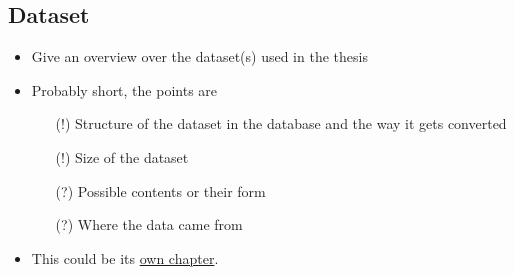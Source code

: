 \subsection{Dataset}
\begin{itemize}
  \item Give an overview over the dataset(s) used in the thesis
  \item Probably short, the points are
        \begin{itemize}
          \item[(!)] Structure of the dataset in the database and the way it gets converted
          \item[(!)] Size of the dataset
          \item[(?)] Possible contents or their form
          \item[(?)] Where the data came from
        \end{itemize}
  \item This could be its \underline{own chapter}.
\end{itemize}